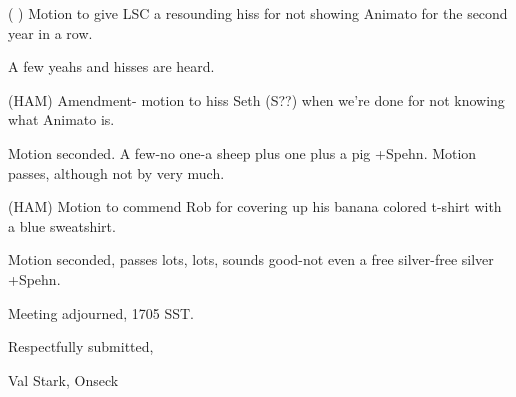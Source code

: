 \documentclass[12pt]{article}
\begin{document}
( ) Motion to give LSC a resounding hiss for not showing Animato for the second year in a row.

A few yeahs and hisses are heard.

(HAM) Amendment- motion to hiss Seth (S??) when we're done for not knowing what Animato is.

Motion seconded. A few-no one-a sheep plus one plus a pig +Spehn. Motion passes, although not by very much.

(HAM) Motion to commend Rob for covering up his banana colored t-shirt with a blue sweatshirt.

Motion seconded, passes lots, lots, sounds good-not even a free silver-free silver +Spehn.

\vspace{12pt}

\noindent
Meeting adjourned, 1705 SST.

\vspace{18pt}

\centerline{Respectfully submitted,}
\centerline{Val Stark, Onseck}
\end{document}
